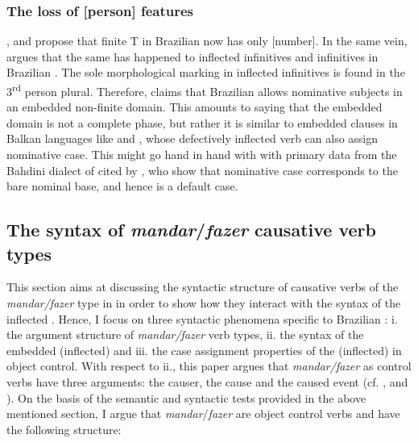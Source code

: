 \documentclass[output=paper]{langsci/langscibook}
\begin{document}
\subsubsection{The loss of [person] features}%
\largerpage
\citet{Nunes2008}, \citet{Ferreira2009} and \citet{Rodrigues2004} propose that finite T in Brazilian  now has only [number]. In the same vein, \citet{Cyrino2010} argues that the same has happened to inflected infinitives and  infinitives in Brazilian . The sole morphological marking in inflected infinitives is found in the 3\textsuperscript{rd} person plural. Therefore, \citet{Cyrino2010} claims that Brazilian  allows nominative subjects in an embedded non-finite domain. This amounts to saying that the embedded domain is not a complete phase, but rather it is similar to embedded  clauses in Balkan languages like  and , whose defectively inflected verb can also assign nominative case. This might go hand in hand with with primary data from the Bahdini dialect of   cited by \citet{Manzini2017}, who show that nominative case corresponds to the bare nominal base, and hence is a default case.  

\subsection{The syntax of \textit{mandar}/\textit{fazer} causative verb types} %

This section aims at discussing the syntactic structure of causative verbs of the \textit{mandar\slash fazer} type in  in order to show how they interact with the syntax of the inflected . Hence, I focus on three syntactic phenomena specific to Brazilian : i. the argument structure of \textit{mandar\slash fazer} verb types, ii. the syntax of the embedded (inflected)  and iii. the case assignment properties of the (inflected)  in object control. With respect to ii., this paper argues that \textit{mandar\slash fazer} as control verbs have three arguments: the causer, the cause and the caused event (cf. \citealt{Zubizarreta1985}, \citealt{Alsina1992} and \citealt{Ippolito2000}). On the basis of the semantic and syntactic tests provided in the above mentioned section, I argue that \textit{mandar}/\textit{fazer} are object control verbs and have the following structure:\largerpage[2]
\end{document}
